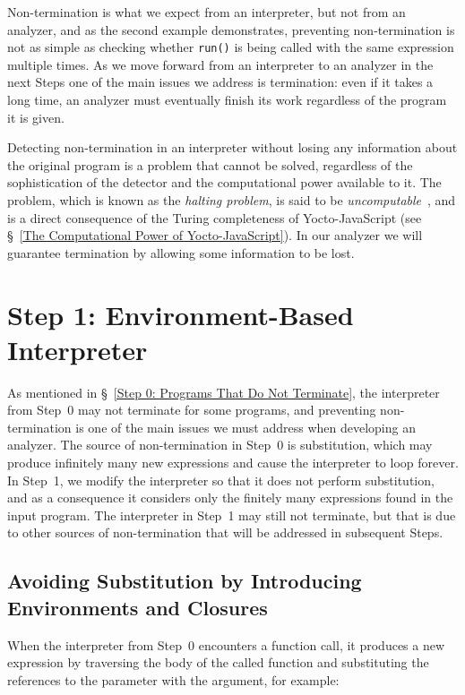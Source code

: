\documentclass[12pt, oneside]{book}
\begin{document}
Non-termination is what we expect from an interpreter, but not from an analyzer, and as the second example demonstrates, preventing non-termination is not as simple as checking whether \texttt{run()} is being called with the same expression multiple times. As we move forward from an interpreter to an analyzer in the next Steps one of the main issues we address is termination: even if it takes a long time, an analyzer must eventually finish its work regardless of the program it is given.

\begin{mdframed}[frametitle = {Advanced}]
Detecting non-termination in an interpreter without losing any information about the original program is a problem that cannot be solved, regardless of the sophistication of the detector and the computational power available to it. The problem, which is known as the \emph{halting problem}, is said to be \emph{uncomputable}~\cite[§~8]{understanding-computation}, and is a direct consequence of the Turing completeness of Yocto-JavaScript (see §~\ref{The Computational Power of Yocto-JavaScript}). In our analyzer we will guarantee termination by allowing some information to be lost.
\end{mdframed}

\section{Step 1: Environment-Based Interpreter}

As mentioned in §~\ref{Step 0: Programs That Do Not Terminate}, the interpreter from Step~0 may not terminate for some programs, and preventing non-termination is one of the main issues we must address when developing an analyzer. The source of non-termination in Step~0 is substitution, which may produce infinitely many new expressions and cause the interpreter to loop forever. In Step~1, we modify the interpreter so that it does not perform substitution, and as a consequence it considers only the finitely many expressions found in the input program. The interpreter in Step~1 may still not terminate, but that is due to other sources of non-termination that will be addressed in subsequent Steps.

\subsection{Avoiding Substitution by Introducing Environments and Closures}

When the interpreter from Step~0 encounters a function call, it produces a new expression by traversing the body of the called function and substituting the references to the parameter with the argument, for example:
\end{document}
